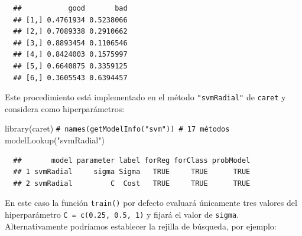 \documentclass[
]{book}
\newenvironment{Shaded}{\begin{snugshade}}{\end{snugshade}}
\newcommand{\AttributeTok}[1]{\textcolor[rgb]{0.77,0.63,0.00}{#1}}
\newcommand{\CommentTok}[1]{\textcolor[rgb]{0.56,0.35,0.01}{\textit{#1}}}
\newcommand{\ConstantTok}[1]{\textcolor[rgb]{0.00,0.00,0.00}{#1}}
\newcommand{\DecValTok}[1]{\textcolor[rgb]{0.00,0.00,0.81}{#1}}
\newcommand{\FloatTok}[1]{\textcolor[rgb]{0.00,0.00,0.81}{#1}}
\newcommand{\FunctionTok}[1]{\textcolor[rgb]{0.00,0.00,0.00}{#1}}
\newcommand{\NormalTok}[1]{#1}
\newcommand{\OtherTok}[1]{\textcolor[rgb]{0.56,0.35,0.01}{#1}}
\newcommand{\SpecialCharTok}[1]{\textcolor[rgb]{0.00,0.00,0.00}{#1}}
\newcommand{\StringTok}[1]{\textcolor[rgb]{0.31,0.60,0.02}{#1}}
\theoremstyle{break}
\theoremstyle{nonumberplain}
\renewcommand{\CommentTok}[1]{\textcolor[rgb]{0.41,0.41,0.41}{\texttt{#1}}}
\begin{document}
\begin{verbatim}
  ##           good       bad
  ## [1,] 0.4761934 0.5238066
  ## [2,] 0.7089338 0.2910662
  ## [3,] 0.8893454 0.1106546
  ## [4,] 0.8424003 0.1575997
  ## [5,] 0.6640875 0.3359125
  ## [6,] 0.3605543 0.6394457
\end{verbatim}

Este procedimiento está implementado en el método \texttt{"svmRadial"} de \texttt{caret} y considera como hiperparámetros:

\begin{Shaded}
\begin{Highlighting}[]
\FunctionTok{library}\NormalTok{(caret)}
\CommentTok{\# names(getModelInfo("svm")) \# 17 métodos}
\FunctionTok{modelLookup}\NormalTok{(}\StringTok{"svmRadial"}\NormalTok{)}
\end{Highlighting}
\end{Shaded}

\begin{verbatim}
  ##       model parameter label forReg forClass probModel
  ## 1 svmRadial     sigma Sigma   TRUE     TRUE      TRUE
  ## 2 svmRadial         C  Cost   TRUE     TRUE      TRUE
\end{verbatim}

En este caso la función \texttt{train()} por defecto evaluará únicamente tres valores del hiperparámetro \texttt{C\ =\ c(0.25,\ 0.5,\ 1)} y fijará el valor de \texttt{sigma}.
Alternativamente podríamos establecer la rejilla de búsqueda, por ejemplo:

\begin{Shaded}
\end{Shaded}
\end{document}
